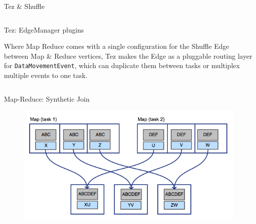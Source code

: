 \documentclass[final]{beamer}
\newlength{\onecolwid}
\newlength{\twocolwid}
\begin{document}
\begin{frame}[t]
\begin{columns}[t]
\begin{column}{\twocolwid}
\begin{columns}[t,totalwidth=\twocolwid]
\begin{column}{\onecolwid}
\begin{block}{Tez \& Shuffle}
\end{block}


\end{column} %

\end{columns} %


\begin{alertblock}{Tez: EdgeManager plugins}

Where Map Reduce comes with a single configuration for the Shuffle Edge between Map \& Reduce vertices,
Tez makes the Edge as a pluggable routing layer for \texttt{DataMovementEvent}, which can duplicate them
between tasks or multiplex multiple events to one task.

\end{alertblock} 


\begin{columns}[t,totalwidth=\twocolwid] %

\begin{column}{\onecolwid} %


\begin{block}{Map-Reduce: Synthetic Join}

\begin{figure}
\includegraphics{figures/gfcross.png}
\end{figure}


\end{block}
\end{column}
\end{columns}
\end{column}
\end{columns}
\end{frame}
\end{document}
